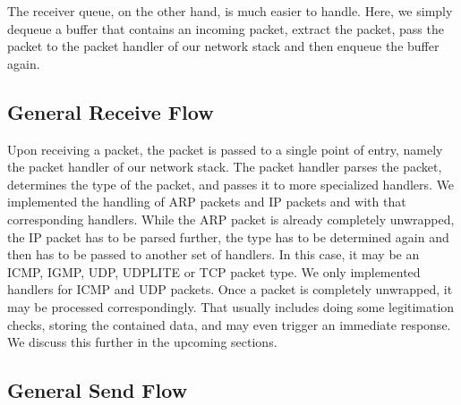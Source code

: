 The receiver queue, on the other hand, is much easier to handle. Here, we simply dequeue a buffer that contains an incoming packet, extract the packet, pass the packet to the packet handler of our network stack and then enqueue the buffer again.

\subsection{General Receive Flow}

Upon receiving a packet, the packet is passed to a single point of entry, namely the packet handler of our network stack.
The packet handler parses the packet, determines the type of the packet, and passes it to more specialized handlers. We implemented the handling of ARP packets and IP packets and with that corresponding handlers. 
While the ARP packet is already completely unwrapped, the IP packet has to be parsed further, the type has to be determined again and then has to be passed to another set of handlers. In this case, it may be an ICMP, IGMP, UDP, UDPLITE or TCP packet type. We only implemented handlers for ICMP and UDP packets.
Once a packet is completely unwrapped, it may be processed correspondingly. That usually includes doing some legitimation checks, storing the contained data, and may even trigger an immediate response. We discuss this further in the upcoming sections.

\subsection{General Send Flow}


